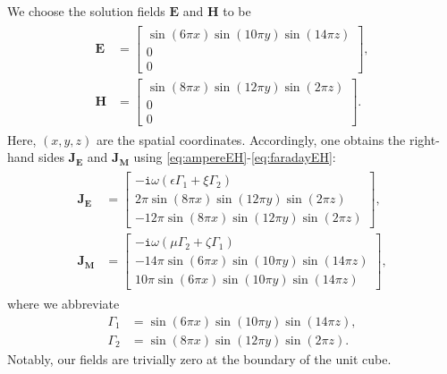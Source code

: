 \documentclass[journal,transmag]{IEEEtran}
\newcommand*\VF[1]{\mathbf{#1}}
\newcommand*\iunit{\mathtt{i}}
\begin{document}
We choose the solution fields $\VF{E}$ and $\VF{H}$ to be 
\begin{align*} \begin{split}
        \VF{E} &= 
        \begin{bmatrix}
            \sin( 6\pi x ) \sin( 10\pi y ) \sin( 14\pi z )
            \\
            0
            \\
            0 
        \end{bmatrix},
        \\
        \VF{H} &= 
        \begin{bmatrix}
            \sin( 8\pi x ) \sin( 12 \pi y ) \sin( 2\pi z )
            \\
            0
            \\
            0 
        \end{bmatrix}.
    \end{split}
\end{align*}
Here, $(x,y,z)$ are the spatial coordinates.
Accordingly, one obtains the right-hand sides $\VF{J_E}$ and $\VF{J_M}$ using \eqref{eq:ampereEH}-\eqref{eq:faradayEH}:
\begin{align*} \begin{split}
        \VF{J}_\VF{E} &= 
        \begin{bmatrix}
            - \iunit \omega ( \epsilon \Gamma_1 + \xi \Gamma_2 )
            \\
            2 \pi \sin(8\pi x) \sin(12\pi y) \sin(2\pi z)
            \\
            -12 \pi \sin(8\pi x) \sin( 12\pi y) \sin(2\pi z)
        \end{bmatrix},
        \\
        \VF{J}_\VF{M} &= 
        \begin{bmatrix}
            - \iunit \omega ( \mu \Gamma_2 + \zeta \Gamma_1) 
            \\
            -14 \pi \sin(6\pi x) \sin(10\pi y) \sin(14\pi z) 
            \\
            10 \pi\sin(6\pi x) \sin(10\pi y) \sin(14\pi z)  
        \end{bmatrix},
    \end{split}
\end{align*}
where we abbreviate 
\begin{align*}
    \Gamma_1 &= \sin(6\pi x) \sin(10\pi y) \sin(14\pi z),
    \\
    \Gamma_2 &= \sin(8\pi x) \sin(12\pi y) \sin( 2\pi z).
\end{align*}
Notably, our fields are trivially zero at the boundary of the unit cube.
\\
\end{document}

